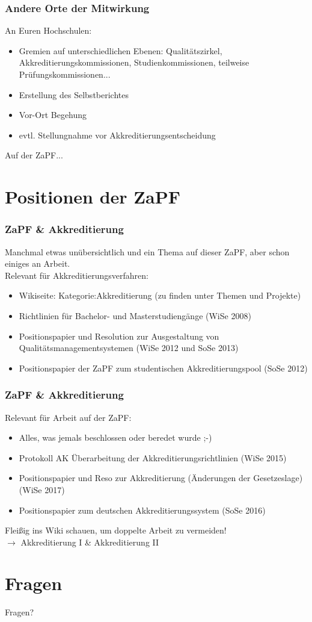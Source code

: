 \documentclass{beamer}
\begin{document}
\begin{frame}
\frametitle{Andere Orte der Mitwirkung}
An Euren Hochschulen:
\begin{itemize}
\item Gremien auf unterschiedlichen Ebenen: Qualitätszirkel, Akkreditierungskommissionen, Studienkommissionen, teilweise Prüfungskommissionen...
\item Erstellung des Selbstberichtes
\item Vor-Ort Begehung
\item evtl. Stellungnahme vor Akkreditierungsentscheidung
\end{itemize}
\vspace*{0.5cm}
Auf der ZaPF...
\end{frame}
\section{Positionen der ZaPF}
\frame{\tableofcontents[currentsection]}
\begin{frame}
\frametitle{ZaPF \& Akkreditierung}
Manchmal etwas unübersichtlich und ein Thema auf dieser ZaPF, aber schon einiges an Arbeit.\\ 

Relevant für Akkreditierungsverfahren:
\begin{itemize}
\item Wikiseite: Kategorie:Akkreditierung (zu finden unter Themen und Projekte)
\item Richtlinien für Bachelor- und Masterstudiengänge (WiSe 2008)
\item Positionspapier und Resolution zur Ausgestaltung von Qualitätsmanagementsystemen (WiSe 2012 und SoSe 2013)
\item Positionspapier der ZaPF zum studentischen Akkreditierungspool (SoSe 2012)
\end{itemize}

\end{frame}
\begin{frame}
\frametitle{ZaPF \& Akkreditierung}

Relevant für Arbeit auf der ZaPF:
\begin{itemize}
\item Alles, was jemals beschlossen oder beredet wurde ;-)
\item Protokoll AK Überarbeitung der Akkreditierungsrichtlinien (WiSe 2015)
\item Positionspapier und Reso zur Akkreditierung (Änderungen der Gesetzeslage)(WiSe 2017)
\item Positionspapier zum deutschen Akkreditierungssystem (SoSe 2016)
\end{itemize}
\vspace{0.5cm}
Fleißig ins Wiki schauen, um doppelte Arbeit zu vermeiden!\\
$\rightarrow$ Akkreditierung I \& Akkreditierung II
\end{frame}
\section*{Fragen}
\begin{frame}
\centering
\Large{ Fragen?}
\end{frame}
\end{document}
